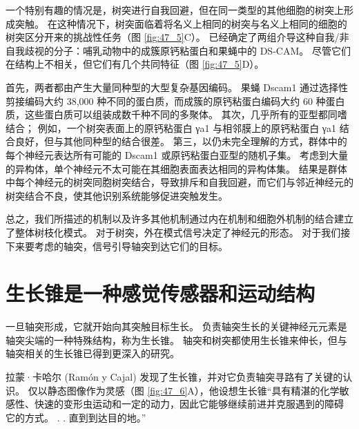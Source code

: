 一个特别有趣的情况是，树突进行自我回避，但在同一类型的其他细胞的树突上形成突触。 在这种情况下，树突面临着将名义上相同的树突与名义上相同的细胞的树突区分开来的挑战性任务（图 \ref{fig:47_5}C）。 已经确定了两组介导这种自我/非自我歧视的分子：哺乳动物中的成簇原钙粘蛋白和果蝇中的 DS-CAM。 尽管它们在结构上不相关，但它们有几个共同特征（图 \ref{fig:47_5}D）。

首先，两者都由产生大量同种型的大型复杂基因编码。 果蝇 Dscam1 通过选择性剪接编码大约 38,000 种不同的蛋白质，而成簇的原钙粘蛋白编码大约 60 种蛋白质，这些蛋白质可以组装成数千种不同的多聚体。 其次，几乎所有的亚型都同嗜结合； 例如，一个树突表面上的原钙粘蛋白 γa1 与相邻膜上的原钙粘蛋白 γa1 结合良好，但与其他同种型的结合很差。 第三，以仍未完全理解的方式，群体中的每个神经元表达所有可能的 Dscam1 或原钙粘蛋白亚型的随机子集。 考虑到大量的异构体，单个神经元不太可能在其细胞表面表达相同的异构体集。 结果是群体中每个神经元的树突同胞树突结合，导致排斥和自我回避，而它们与邻近神经元的树突结合不良，使其他识别系统能够促进突触发生。

总之，我们所描述的机制以及许多其他机制通过内在机制和细胞外机制的结合建立了整体树枝化模式。 对于树突，外在模式信号决定了神经元的形态。 对于我们接下来要考虑的轴突，信号引导轴突到达它们的目标。

\section{生长锥是一种感觉传感器和运动结构}
一旦轴突形成，它就开始向其突触目标生长。 负责轴突生长的关键神经元元素是轴突尖端的一种特殊结构，称为生长锥。 轴突和树突都使用生长锥来伸长，但与轴突相关的生长锥已得到更深入的研究。

拉蒙·卡哈尔 (Ramón y Cajal) 发现了生长锥，并对它负责轴突寻路有了关键的认识。 
仅以静态图像作为灵感（图 \ref{fig:47_6}A），他设想生长锥“具有精湛的化学敏感性、快速的变形虫运动和一定的动力，因此它能够继续前进并克服遇到的障碍 它的方式。 . . 直到到达目的地。”

